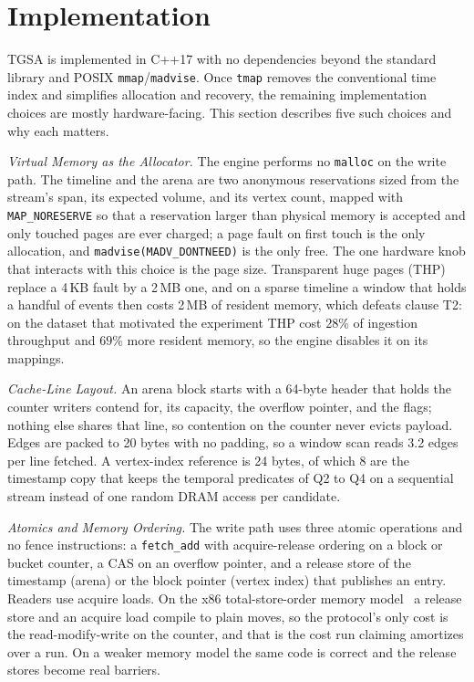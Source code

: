 \documentclass[sigconf,nonacm]{acmart}
\newcommand{\sys}{TGSA\xspace}
\newcommand{\tmap}{\texttt{tmap}\xspace}
\begin{document}
\section{Implementation}\label{sec:impl}
\sys is implemented in C++17 with no dependencies beyond the standard
library and POSIX \texttt{mmap}/\texttt{madvise}. Once \tmap removes the conventional time index and simplifies
allocation and recovery, the remaining implementation choices are
mostly hardware-facing. This section describes five such choices and
why each matters.

\emph{Virtual Memory as the Allocator.} The engine performs no
\texttt{malloc} on the write path. The timeline and the arena are two
anonymous reservations sized from the stream's span, its expected
volume, and its vertex count, mapped with \texttt{MAP\_NORESERVE} so
that a reservation larger than physical memory is accepted and only
touched pages are ever charged; a page fault on first touch is the only
allocation, and
\texttt{madvise(MADV\_DONTNEED)} is the only free. The one hardware
knob that interacts with this choice is the page size. Transparent
huge pages (THP)~\cite{kwon2016ingens} replace a 4\,KB fault by a 2\,MB one, and on a sparse
timeline a window that holds a handful of events then costs 2\,MB of
resident memory, which defeats clause T2: on the dataset that motivated
the experiment THP cost $28\%$ of ingestion throughput and $69\%$ more
resident memory, so the engine disables it on its mappings.

\emph{Cache-Line Layout.} An arena block starts with a 64-byte header
that holds the counter writers contend for, its capacity, the overflow
pointer, and the flags; nothing else shares that line, so contention
on the counter never evicts payload. Edges are packed to 20 bytes with
no padding, so a window scan reads 3.2 edges per line fetched. A
vertex-index reference is 24 bytes, of which 8 are the timestamp copy
that keeps the temporal predicates of Q2 to Q4 on a sequential stream
instead of one random DRAM access per candidate.

\emph{Atomics and Memory Ordering.} The write path uses three atomic
operations and no fence instructions: a \texttt{fetch\_add} with
acquire-release ordering on a block or bucket counter, a CAS on an
overflow pointer, and a release store of the timestamp (arena) or the
block pointer (vertex index) that publishes an entry. Readers use
acquire loads. On the x86 total-store-order memory model~\cite{sewell2010x86tso} a release
store and an acquire load compile to plain moves, so the protocol's
only cost is the read-modify-write on the counter, and that is the
cost run claiming amortizes over a run. On a weaker memory model the
same code is correct and the release stores become real barriers.
\end{document}

